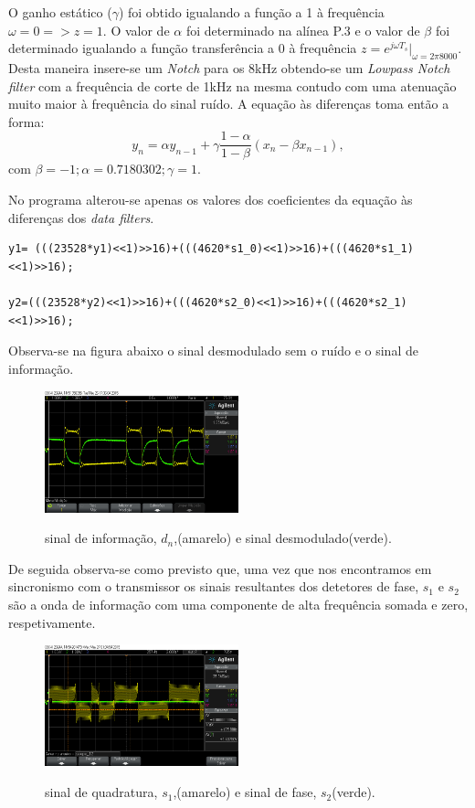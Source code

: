 \documentclass[11pt]{article}
\numberwithin{equation}{section}
\begin{document}
O ganho estático ($\gamma$) foi obtido igualando a função a 1 à frequência $\omega=0 => z=1$. O valor de $\alpha$ foi determinado na alínea P.3 e o valor de $\beta$ foi determinado igualando a função transferência a 0 à frequência $z=e^{j\omega T_s}|_{\omega=2\pi8000}$. Desta maneira insere-se um \textit{Notch} para os 8kHz obtendo-se um \textit{Lowpass Notch filter} com a frequência de corte de 1kHz na mesma contudo com uma atenuação muito maior à frequência do sinal ruído.
A equação às diferenças toma então a forma:
\begin{equation}
y_n = \alpha y_{n-1}+\gamma\frac{1-\alpha}{1-\beta}(x_n-\beta x_{n-1}), 
\end{equation}
com $\beta=-1; \alpha=0.7180302; \gamma=1.$

No programa alterou-se apenas os valores dos coeficientes da equação às diferenças dos \textit{data filters}.

\begin{lstlisting}
y1= (((23528*y1)<<1)>>16)+(((4620*s1_0)<<1)>>16)+(((4620*s1_1)<<1)>>16);

y2=(((23528*y2)<<1)>>16)+(((4620*s2_0)<<1)>>16)+(((4620*s2_1)<<1)>>16);
\end{lstlisting}
Observa-se na figura abaixo o sinal desmodulado sem o ruído e o sinal de informação.

\begin{figure}[H]
	\centering
	\includegraphics[width=0.5\textwidth]{./dn_y1}~\\
	\caption{sinal de informação, $d_n$,(amarelo) e sinal desmodulado(verde).}
	\label{demod}
\end{figure}

De seguida observa-se como previsto que, uma vez que nos encontramos em sincronismo com o transmissor os sinais resultantes dos detetores de fase, $s_1$ e $s_2$ são a onda de informação com uma componente de alta frequência somada e zero, respetivamente.

\begin{figure}[H]
	\centering
	\includegraphics[width=0.5\textwidth]{./s1_s2n}~\\
	\caption{sinal de quadratura, $s_1$,(amarelo) e sinal de fase, $s_2$(verde).}
	\label{s1_s2}
\end{figure}
\end{document}
